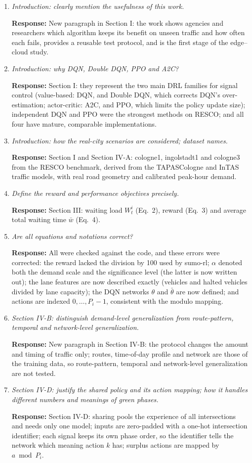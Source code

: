 \documentclass[11pt,a4paper]{article}
\newcommand{\cm}[2]{\item[\textbf{#1.}] \textit{#2}\par}
\newcommand{\re}{\par\textbf{Response:} }
\begin{document}
\begin{enumerate}[leftmargin=*, label={}, itemsep=6pt]
\cm{22}{Introduction: clearly mention the usefulness of this work.}
\re New paragraph in Section I: the work shows agencies and researchers which algorithm keeps its benefit on unseen traffic and how often each fails, provides a reusable test protocol, and is the first stage of the edge--cloud study.

\cm{23}{Introduction: why DQN, Double DQN, PPO and A2C?}
\re Section I: they represent the two main DRL families for signal control (value-based: DQN, and Double DQN, which corrects DQN's over-estimation; actor-critic: A2C, and PPO, which limits the policy update size); independent DQN and PPO were the strongest methods on RESCO; and all four have mature, comparable implementations.

\cm{24}{Introduction: how the real-city scenarios are considered; dataset names.}
\re Section I and Section IV-A: cologne1, ingolstadt1 and cologne3 from the RESCO benchmark, derived from the TAPASCologne and InTAS traffic models, with real road geometry and calibrated peak-hour demand.

\cm{25}{Define the reward and performance objectives precisely.}
\re Section III: waiting load $W^i_t$ (Eq.~2), reward (Eq.~3) and average total waiting time $\bar{w}$ (Eq.~4).

\cm{26}{Are all equations and notations correct?}
\re All were checked against the code, and these errors were corrected: the reward lacked the division by 100 used by sumo-rl; $\alpha$ denoted both the demand scale and the significance level (the latter is now written out); the lane features are now described exactly (vehicles and halted vehicles divided by lane capacity); the DQN networks $\theta$ and $\bar\theta$ are now defined; and actions are indexed $0,\dots,P_i-1$, consistent with the modulo mapping.

\cm{27}{Section IV-B: distinguish demand-level generalization from route-pattern, temporal and network-level generalization.}
\re New paragraph in Section IV-B: the protocol changes the amount and timing of traffic only; routes, time-of-day profile and network are those of the training data, so route-pattern, temporal and network-level generalization are not tested.

\cm{28}{Section IV-D: justify the shared policy and its action mapping; how it handles different numbers and meanings of green phases.}
\re Section IV-D: sharing pools the experience of all intersections and needs only one model; inputs are zero-padded with a one-hot intersection identifier; each signal keeps its own phase order, so the identifier tells the network which meaning action $k$ has; surplus actions are mapped by $a \bmod P_i$.


\end{enumerate}
\end{document}
